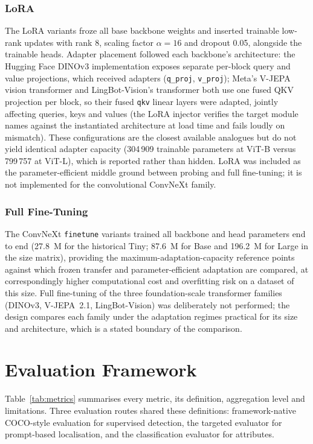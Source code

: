 \subsubsection{LoRA}
The LoRA variants froze all base backbone weights and inserted trainable low-rank updates \citep{hu2022lora} with rank 8, scaling factor $\alpha = 16$ and dropout 0.05, alongside the trainable heads. Adapter placement followed each backbone's architecture: the Hugging Face DINOv3 implementation exposes separate per-block query and value projections, which received adapters (\texttt{q\_proj}, \texttt{v\_proj}); Meta's V-JEPA vision transformer and LingBot-Vision's transformer both use one fused QKV projection per block, so their fused \texttt{qkv} linear layers were adapted, jointly affecting queries, keys and values (the LoRA injector verifies the target module names against the instantiated architecture at load time and fails loudly on mismatch). These configurations are the closest available analogues but do not yield identical adapter capacity (304\,909 trainable parameters at ViT-B versus 799\,757 at ViT-L), which is reported rather than hidden. LoRA was included as the parameter-efficient middle ground between probing and full fine-tuning; it is not implemented for the convolutional ConvNeXt family.

\subsubsection{Full Fine-Tuning}
The ConvNeXt \texttt{finetune} variants trained all backbone and head parameters end to end (27.8~M for the historical Tiny; 87.6~M for Base and 196.2~M for Large in the size matrix), providing the maximum-adaptation-capacity reference points against which frozen transfer and parameter-efficient adaptation are compared, at correspondingly higher computational cost and overfitting risk on a dataset of this size. Full fine-tuning of the three foundation-scale transformer families (DINOv3, V-JEPA~2.1, LingBot-Vision) was deliberately not performed; the design compares each family under the adaptation regimes practical for its size and architecture, which is a stated boundary of the comparison.

\section{Evaluation Framework}
\label{sec:evaluation-framework}

Table~\ref{tab:metrics} summarises every metric, its definition, aggregation level and limitations. Three evaluation routes shared these definitions: framework-native COCO-style evaluation for supervised detection, the targeted evaluator for prompt-based localisation, and the classification evaluator for attributes.

